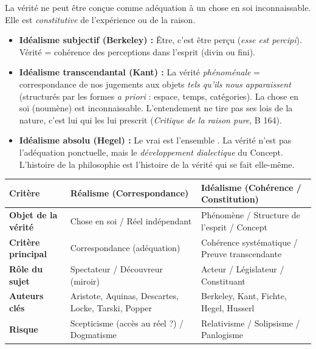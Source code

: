 \documentclass[11pt]{article}
\begin{document}
\begin{definition}
La vérité ne peut être conçue comme adéquation à un \guillemotleft chose en soi \guillemotright inconnaissable. Elle est \emph{constitutive} de l'expérience ou de la raison.
\begin{itemize}
    \item \textbf{Idéalisme subjectif (Berkeley) :} \guillemotleft Être, c'est être perçu \guillemotright (\emph{esse est percipi}). Vérité = cohérence des perceptions dans l'esprit (divin ou fini).
    \item \textbf{Idéalisme transcendantal (Kant) :} La vérité \emph{phénoménale} = correspondance de nos jugements aux objets \emph{tels qu'ils nous apparaissent} (structurés par les formes \emph{a priori} : espace, temps, catégories). La \guillemotleft chose en soi \guillemotright (noumène) est inconnaissable. \guillemotleft L'entendement ne tire pas ses lois de la nature, c'est lui qui les lui prescrit \guillemotright (\emph{Critique de la raison pure}, B 164).
    \item \textbf{Idéalisme absolu (Hegel) :} \guillemotleft Le vrai est l'ensemble \guillemotright. La vérité n'est pas l'adéquation ponctuelle, mais le \emph{développement dialectique} du Concept. L'histoire de la philosophie est l'histoire de la vérité qui se fait elle-même.
\end{itemize}
\end{definition}

\begin{center}
\begin{tabularx}{\linewidth}{|l|X|X|}
\hline
\rowcolor{popblueL}
\textbf{Critère} & \textbf{Réalisme (Correspondance)} & \textbf{Idéalisme (Cohérence / Constitution)} \\
\hline
\textbf{Objet de la vérité} & Chose en soi / Réel indépendant & Phénomène / Structure de l'esprit / Concept \\
\hline
\textbf{Critère principal} & Correspondance (adéquation) & Cohérence systématique / Preuve transcendante \\
\hline
\textbf{Rôle du sujet} & Spectateur / Découvreur (miroir) & Acteur / Législateur / Constituant \\
\hline
\textbf{Auteurs clés} & Aristote, Aquinas, Descartes, Locke, Tarski, Popper & Berkeley, Kant, Fichte, Hegel, Husserl \\
\hline
\textbf{Risque} & Scepticisme (accès au réel ?) / Dogmatisme & Relativisme / Solipsisme / Panlogisme \\
\hline
\end{tabularx}
\end{center}
\end{document}
